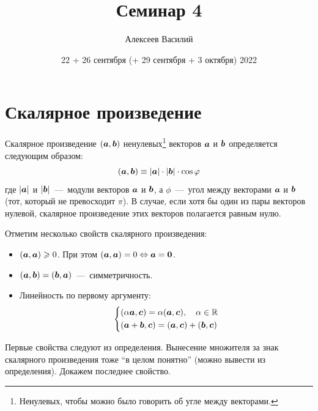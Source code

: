 \documentclass[a4paper,12pt]{article}
\author{Алексеев Василий}
\title{Семинар 4}
\date{22 + 26 сентября (+ 29 сентября + 3 октября) 2022}
\begin{document}
  \maketitle
  
  \tableofcontents

  \thispagestyle{empty}
  
  \newpage
  
  


  \section{Скалярное произведение}
  
  \begin{definition}
    Скалярное произведение $(\boldsymbol a, \boldsymbol b)$ ненулевых\footnote{Ненулевых, чтобы можно было говорить об угле между векторами.} векторов $\boldsymbol a$ и $\boldsymbol b$ определяется следующим образом:
    \begin{equation}
      (\boldsymbol a, \boldsymbol b) \equiv |\boldsymbol a| \cdot |\boldsymbol b| \cdot \cos \varphi
    \end{equation}
    где $|\boldsymbol a|$ и $|\boldsymbol b|$~---~модули векторов $\boldsymbol a$ и $\boldsymbol b$,
    а $\phi$~---~угол между векторами $\boldsymbol a$ и $\boldsymbol b$ (тот, который не превосходит $\pi$).
    В случае, если хотя бы один из пары векторов нулевой, скалярное произведение этих векторов полагается равным нулю.
  \end{definition}
  
  Отметим несколько свойств скалярного произведения:
  \begin{itemize}
    \item $(\boldsymbol a, \boldsymbol a) \geqslant 0$. При этом $(\bds a, \bds a) \hm= 0 \hm\Leftrightarrow \bds a \hm= \bds 0$.
    \item $(\boldsymbol a, \boldsymbol b) = (\boldsymbol b, \boldsymbol a)$~---~симметричность.
    \item Линейность по первому аргументу:
      \[
        \left\{
          \begin{aligned}
            &(\alpha \boldsymbol a, \boldsymbol c) = \alpha (\boldsymbol a, \boldsymbol c),\quad \alpha \in \operatorname{\mathbb R}\\
            &(\boldsymbol a + \boldsymbol b, \boldsymbol c) = (\boldsymbol a, \boldsymbol c) + (\boldsymbol b, \boldsymbol c)
          \end{aligned}
        \right.
      \]
  \end{itemize}
  
  Первые свойства следуют из определения.
  Вынесение множителя за знак скалярного произведения тоже ``в целом понятно'' (можно вывести из определения).
  Докажем последнее свойство.
  
\end{document}
